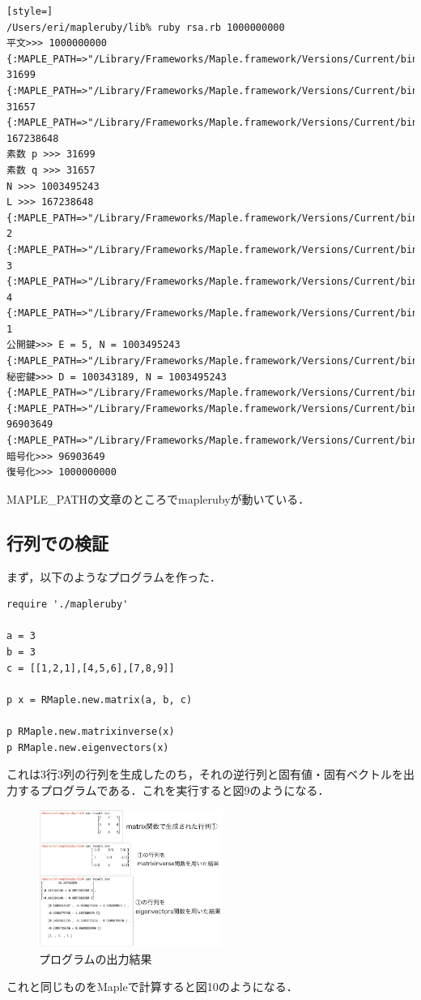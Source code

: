\begin{lstlisting}[style=]
/Users/eri/mapleruby/lib% ruby rsa.rb 1000000000
平文>>> 1000000000
{:MAPLE_PATH=>"/Library/Frameworks/Maple.framework/Versions/Current/bin/maple"}
31699
{:MAPLE_PATH=>"/Library/Frameworks/Maple.framework/Versions/Current/bin/maple"}
31657
{:MAPLE_PATH=>"/Library/Frameworks/Maple.framework/Versions/Current/bin/maple"}
167238648
素数 p >>> 31699
素数 q >>> 31657
N >>> 1003495243
L >>> 167238648
{:MAPLE_PATH=>"/Library/Frameworks/Maple.framework/Versions/Current/bin/maple"}
2
{:MAPLE_PATH=>"/Library/Frameworks/Maple.framework/Versions/Current/bin/maple"}
3
{:MAPLE_PATH=>"/Library/Frameworks/Maple.framework/Versions/Current/bin/maple"}
4
{:MAPLE_PATH=>"/Library/Frameworks/Maple.framework/Versions/Current/bin/maple"}
1
公開鍵>>> E = 5, N = 1003495243
{:MAPLE_PATH=>"/Library/Frameworks/Maple.framework/Versions/Current/bin/maple"}
秘密鍵>>> D = 100343189, N = 1003495243
{:MAPLE_PATH=>"/Library/Frameworks/Maple.framework/Versions/Current/bin/maple"}
{:MAPLE_PATH=>"/Library/Frameworks/Maple.framework/Versions/Current/bin/maple"}
96903649
{:MAPLE_PATH=>"/Library/Frameworks/Maple.framework/Versions/Current/bin/maple"}
暗号化>>> 96903649
復号化>>> 1000000000
\end{lstlisting}\begin{description}
\item[MAPLE\_PATHの文章のところでmaplerubyが動いている．
]\end{description}
\subsection{行列での検証}
まず，以下のようなプログラムを作った．
\begin{lstlisting}[style=customRuby]
require './mapleruby'

a = 3
b = 3
c = [[1,2,1],[4,5,6],[7,8,9]]

p x = RMaple.new.matrix(a, b, c)

p RMaple.new.matrixinverse(x)
p RMaple.new.eigenvectors(x)
\end{lstlisting}
これは3行3列の行列を生成したのち，それの逆行列と固有値・固有ベクトルを出力するプログラムである．これを実行すると図9のようになる．

\begin{figure}[htbp]\begin{center}
\includegraphics[width=6cm,bb=0 0 442 500]{../figs/./mapleruby_eringi.008.png}
\caption{プログラムの出力結果}
\label{default}\end{center}\end{figure}
これと同じものをMapleで計算すると図10のようになる．

